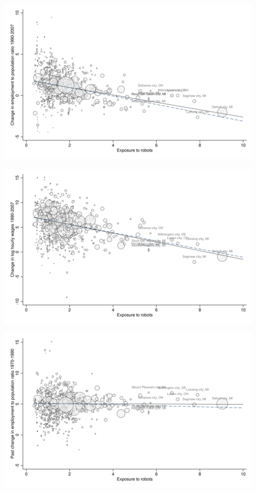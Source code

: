 \documentclass{article}
\begin{document}
\begin{center}\includegraphics[scale=0.15]{output/figure_longdif_emppriv.png}\end{center}
\begin{center}\includegraphics[scale=0.15]{output/figure_longdif_hrwage.png}\end{center}
\begin{center}\includegraphics[scale=0.15]{output/figure_placebo_emppriv.png}\end{center}
\end{document}
